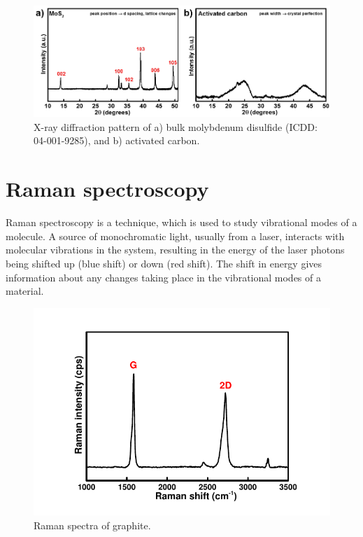 \begin{figure}[tbh!]
\centering
\includegraphics[width=\textwidth]{Figures/chap2fig/XRD.pdf}
\caption{X-ray diffraction pattern of a) bulk molybdenum disulfide (ICDD: 04-001-9285), and b) activated carbon.}
\label{Figures/chap2fig:XRD}
\end{figure}

\section{Raman spectroscopy}
Raman spectroscopy is a technique, which is used to study vibrational modes of a molecule. A source of monochromatic light, usually from a laser, interacts with molecular vibrations in the system, resulting in the energy of the laser photons being shifted up (blue shift) or down (red shift). The shift in energy gives information about any changes taking place in the vibrational modes of a material. 
\begin{figure}[tbh!]
\centering
\includegraphics[width=\textwidth]{Figures/chap2fig/Raman.pdf}
\caption{Raman spectra of graphite.}
\label{Figures/chap2fig:Raman}
\end{figure}


